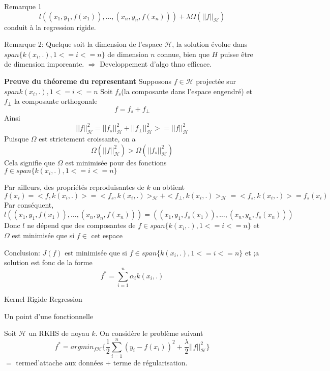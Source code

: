 \documentclass{article}
\begin{document}
Remarque 1
\begin{equation}
l((x_1,y_1,f(x_1)),\ldots,(x_n,y_n,f(x_n)))+\lambda\Omega(||f||_\mathcal{H})
\end{equation}
conduit \`a la regression rigide.

Remarque 2:
Quelque soit la dimension de l'espace $\mathcal{H}$, la solution \'evolue dans $span\{k(x_i,.),1<=i<=n\}$
de dimension $n$ connue, bien que $H$ puisse \^etre de dimension imporeante.
$\Rightarrow$ Developpement d'algo thno efficace.

\textbf{Preuve du th\'eoreme du representant}
Supposons $f\in\mathcal{H}$ project\'ee sur $span{k(x_i,.),1<=i<=n}$
Soit $f_s$(la composante dans l'espace engendr\'e) et $f_\perp$ la composante orthogonale
\begin{equation}
f=f_s+f_\perp
\end{equation}
Ainsi
\begin{equation}
||f||_\mathcal{H}^2=||f_s||^2_\mathcal{H}+||f_\perp||_\mathcal{H}^2>=||f||_\mathcal{H}^2
\end{equation}
Puisque $\Omega$ est strictement croissante, on a 
\begin{equation}
\Omega(||f||_\mathcal{H}^2)>\Omega(||f_s||_\mathcal{H}^2)
\end{equation}
Cela signifie que $\Omega$ est minimis\'ee pour des fonctions $f\in span\{k(x_i,.),1<=i<=n\}$

Par ailleurs, des propri\'et\'es reproduisantes de $k$ on obtient
\begin{equation}
f(x_i)=<f,k(x_i,.)>=<f_s,k(x_i,.)>_\mathcal{H}+<f_\perp,k(x_i,.)>_\mathcal{H}=<f_s,k(x_i,.)>=f_s(x_i)
\end{equation}
Par cons\'equent,
\begin{equation}
l((x_1,y_1,f(x_1)),\ldots,(x_n,y_n,f(x_n)))=((x_1,y_1,f_s(x_1)),\ldots,(x_n,y_n,f_s(x_n)))
\end{equation}
Donc $l$ ne d\'epend que des composantes de $f\in span\{k(x_i,.),1<=i<=n\}$ et $\Omega$ est minimis\'ee que si $f\in$ cet espace

Conclusion:
$J(f)$ est minimis\'ee que si $f\in span\{k(x_i,.),1<=i<=n\}$ et ;a solution est fonc de la forme
\begin{equation}
f^*=\sum_{i=1}^n\alpha_ik(x_i,.)
\end{equation}

Kernel Rigide Regression

Un point d'une fonctionnelle

Soit $\mathcal{H}$ un RKHS de noyau $k$. On consid\`ere le probl\`eme suivant
\begin{equation}
f^*=argmin_{f\mathcal{H}}\{\frac{1}{2}\sum_{i=1}^n (y_i-f(x_i))^2+\frac{\lambda}{2}||f||_\mathcal{H}^2\}
\end{equation}
$=$ termed'attache aux donn\'ees $+$ terme de r\'egularisation.
\end{document}
